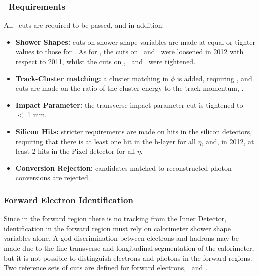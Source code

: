 \subsubsection{\tightPP\ Requirements}


All \mediumPP\ cuts are required to be passed, and in addition:

\begin{itemize}
    \item {\bf Shower Shapes:} cuts on shower shape variables are made at equal
    or tighter values to those for \mediumPP. As for \mediumPP,
    the cuts on \Reta\ and \Rhad\ were loosened in 2012 with respect to 2011, 
    whilst the cuts on  \wetatwo, \Eratio\ and
    \wstot\ were tightened.

    \item {\bf Track-Cluster matching:} a cluster matching in $\phi$ is added,
    requiring , and cuts are made on the ratio of the cluster
    energy to the track momentum, \Eoverp.

    \item {\bf Impact Parameter:} the
    transverse impact parameter cut is tightened to \dzero\ $<$ 1 mm.

    \item {\bf Silicon Hits:} stricter requirements are made on hits in the
    silicon detectors, requiring that there is at least one hit in the b-layer for
    all $\eta$, and, in 2012, at least 2 hits in the Pixel detector for all
    $\eta$.

    \item {\bf Conversion Rejection:} candidates matched to reconstructed photon
    conversions are rejected.

\end{itemize}

\subsubsection{Forward Electron Identification}

Since in the forward region there is no tracking from the Inner Detector,
identification in the forward region must rely on calorimeter shower shape
variables alone. A god discrimination between electrons and hadrons may be made
due to the fine transverse and longitudinal segmentation of the calorimeter, but
it is not possible to distinguish electrons and photons in the forward regions.
Two reference sets of cuts are defined for forward electrons, \loose\ and
\tight.

